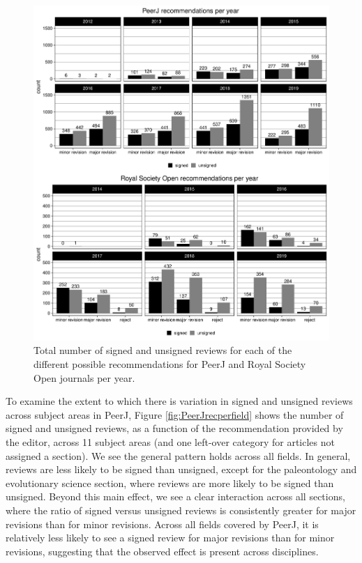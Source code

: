 \documentclass[
  english,
  ,jou, a4paper,floatsintext]{apa6}
\begin{document}
\begin{figure}
\centering
\includegraphics{open_peer_review_files/figure-latex/recperyear-1.pdf}
\caption{\label{fig:recperyear}Total number of signed and unsigned reviews for each of the different possible recommendations for PeerJ and Royal Society Open journals per year.}
\end{figure}

\twocolumn

To examine the extent to which there is variation in signed and unsigned reviews across subject areas in PeerJ, Figure \ref{fig:PeerJrecperfield} shows the number of signed and unsigned reviews, as a function of the recommendation provided by the editor, across 11 subject areas (and one left-over category for articles not assigned a section). We see the general pattern holds across all fields. In general, reviews are less likely to be signed than unsigned, except for the paleontology and evolutionary science section, where reviews are more likely to be signed than unsigned. Beyond this main effect, we see a clear interaction across all sections, where the ratio of signed versus unsigned reviews is consistently greater for major revisions than for minor revisions. Across all fields covered by PeerJ, it is relatively less likely to see a signed review for major revisions than for minor revisions, suggesting that the observed effect is present across disciplines.
\end{document}
